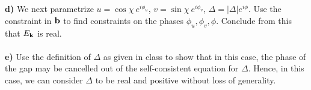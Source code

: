 \begin{problem}
	\ \\
	\ \\
	{\bf d)} We next parametrize $u = \cos \chi ~e^{i \phi_u}$, $v =  \sin \chi ~e^{i \phi_v} $, $\Delta = |\Delta| e^{i \phi}$. Use the constraint in ${\bf b}$ to find constraints on the phases $\phi_u,\phi_v,\phi$. Conclude from this that $E_{\bf k}$ is real. 
	\ \\
	\ \\
	{\bf e)} Use the definition of $\Delta$ as given in class to show that in this case, the phase of the gap may be cancelled out of the self-consistent equation for $\Delta$. Hence, in this case, we can consider $\Delta$ to be real and positive without loss of generality.   
\end{problem}
\begin{problem}
	

\end{problem}
